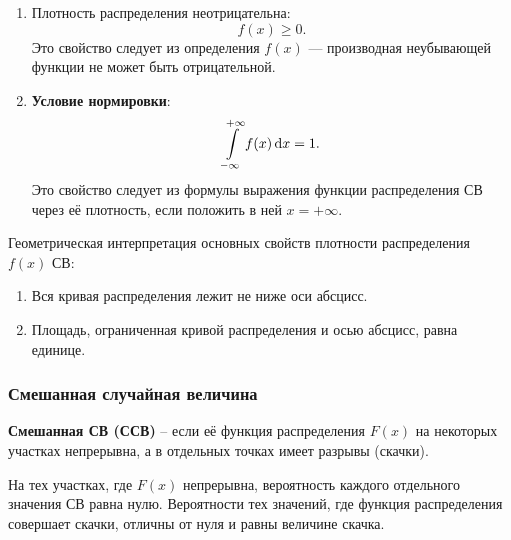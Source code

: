 \documentclass[a4paper]{article}
\newcommand{\sgeq}{\geqslant}
\newcommand{\key}[1]{{\color{Medium}\bfseries #1}}
\begin{document}
                    \begin{enumerate}
                        \item Плотность распределения неотрицательна:
                        \begin{equation*}
                            f(x) \sgeq 0 .
                        \end{equation*}
                        Это свойство следует из определения $f(x)$ --- производная неубывающей функции не может быть отрицательной.

                        \item \key{Условие нормировки}:
                        \begin{equation*}
                            \int\limits_{-\infty}^{+\infty} f(x) \dif x = 1 .
                        \end{equation*}
                        Это свойство следует из формулы выражения функции распределения СВ через её плотность, если положить в ней $x = +\infty$.
                    \end{enumerate}

                    Геометрическая интерпретация основных свойств плотности распределения $f(x)$ СВ:
                    \begin{enumerate}
                        \item Вся кривая распределения лежит не ниже оси абсцисс.
                        \item Площадь, ограниченная кривой распределения и осью абсцисс, равна единице.
                    \end{enumerate}

            \subsubsection{Смешанная случайная величина}
            
                \key{Смешанная СВ (ССВ)} -- если её функция распределения $F(x)$ на некоторых участках непрерывна, а в отдельных точках имеет разрывы (скачки).
                
                На тех участках, где $F(x)$ непрерывна, вероятность каждого отдельного значения СВ равна нулю. Вероятности тех значений, где функция распределения совершает скачки, отличны от нуля и равны величине скачка.

        \newpage
        
\end{document}
